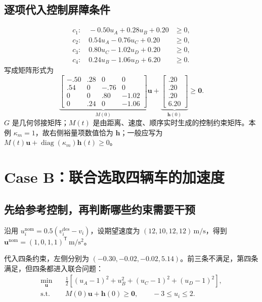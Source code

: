 \documentclass[UTF8,fontset=fandol,11pt,a4paper]{ctexart}
\newcommand{\nom}{\mathrm{nom}}
\newcommand{\unit}[1]{\,\mathrm{#1}}
\begin{document}
\subsection{逐项代入控制屏障条件}
\begin{align}
c_1:\quad -0.50u_A+0.28u_B+0.20&\geq0,\\
c_2:\quad 0.54u_A-0.76u_C+0.20&\geq0,\\
c_3:\quad 0.80u_C-1.02u_D+0.20&\geq0,\\
c_4:\quad 0.24u_B-1.06u_D+6.20&\geq0.
\end{align}
写成矩阵形式为
\begin{equation}
\underbrace{\begin{bmatrix}
-.50&.28&0&0\\.54&0&-.76&0\\0&0&.80&-1.02\\0&.24&0&-1.06
\end{bmatrix}}_{M(0)}\mathbf u+
\underbrace{\begin{bmatrix}.20\\.20\\.20\\6.20\end{bmatrix}}_{\mathbf h(0)}\geq\mathbf0.
\end{equation}
$G$ 是几何邻接矩阵；$M(t)$ 是由距离、速度、顺序实时生成的控制约束矩阵。本例 $\kappa_m=1$，故右侧裕量项数值恰为 $\mathbf h$；一般应写为 $M(t)\mathbf u+\operatorname{diag}(\kappa_m)\mathbf h(t)\geq0$。

\newpage
\section{Case B：联合选取四辆车的加速度}
\subsection{先给参考控制，再判断哪些约束需要干预}
沿用 $u_i^{\nom}=0.5(v_i^{\mathrm{des}}-v_i)$，设期望速度为 $(12,10,12,12)\unit{m/s}$，得到 $\mathbf u^{\nom}=(1,0,1,1)^{\mathsf T}\unit{m/s^2}$。

代入四条约束，左侧分别为 $(-0.30,-0.02,-0.02,5.14)$。前三条不满足，第四条满足，但四条都进入联合问题：
\[
\begin{aligned}
\min_{\mathbf u}\quad &\tfrac12[(u_A-1)^2+u_B^2+(u_C-1)^2+(u_D-1)^2],\\
\text{s.t.}\quad &M(0)\mathbf u+\mathbf h(0)\geq\mathbf0,\qquad -3\leq u_i\leq2.
\end{aligned}
\]
\end{document}
